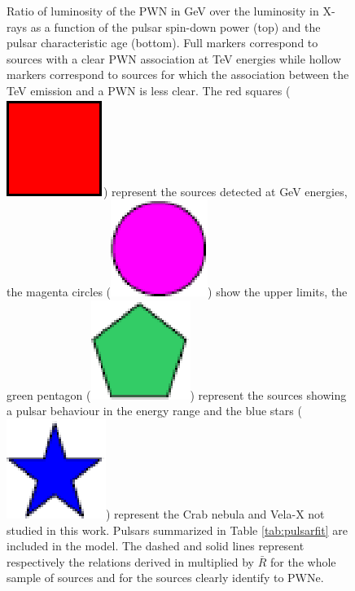 \begin{figure}[h!]
\caption{Ratio of luminosity of the PWN in GeV over the luminosity in X-rays as a function of the pulsar spin-down power (top) and the pulsar characteristic age (bottom). Full markers correspond to sources with a clear PWN association at TeV energies while hollow markers correspond to sources for which the association between the TeV emission and a PWN is less clear. The red squares (\protect\includegraphics[scale=0.25]{figures/carrerouge.eps}) represent the sources detected at GeV energies, the magenta circles (\protect\includegraphics[scale=0.25]{figures/rondmagenta.eps}) show the upper limits, the green pentagon (\protect\includegraphics[scale=0.25]{figures/pentagonevert.eps}) represent the sources showing a pulsar behaviour in the energy range and the blue stars (\protect\includegraphics[scale=0.25]{figures/etoilebleue.eps}) represent the Crab nebula and Vela-X not studied in this work. Pulsars summarized in Table \ref{tab:pulsarfit} are included in the model. The dashed and solid lines represent respectively the relations derived in \cite{2009ApJ...694...12M} multiplied by $\bar{R}$ for the whole sample of sources and for the sources clearly identify to PWNe.
\label{fig:rapportX}}
\end{figure}

